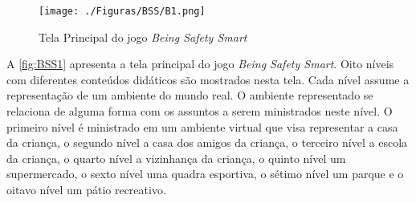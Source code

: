 
\begin{figure}[htb]
	\caption{\label{fig:BSS1}Tela Principal do jogo \textit{Being Safety Smart}}
  \begin{center}\vspace{-0.3cm}
    \texttt{[image: ./Figuras/BSS/B1.png]}
	\end{center}\vspace{-0.5cm}

\end{figure}

A \autoref{fig:BSS1} apresenta a tela principal do jogo \textit{Being Safety Smart}. Oito níveis com diferentes conteúdos didáticos são mostrados nesta tela. Cada nível assume a representação de um ambiente do mundo real. O ambiente representado se relaciona de alguma forma com os assuntos a serem ministrados neste nível. O primeiro nível é ministrado em um ambiente virtual que visa representar a casa da criança, o segundo nível a casa dos amigos da criança, o terceiro nível a escola da criança, o quarto nível a vizinhança da criança, o quinto nível um supermercado, o sexto nível uma quadra esportiva, o sétimo nível um parque e o oitavo nível um pátio recreativo.

